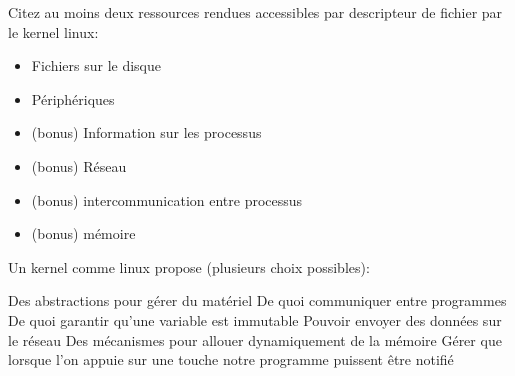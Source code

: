 \documentclass[11pt,a4paper,addpoint]{exam}
\begin{document}
\begin{questions}
    \question[2] Citez au moins deux ressources rendues accessibles par descripteur de fichier par le kernel linux:
    \ifprintanswers
    \begin{solution}
        \begin{itemize}
            \item Fichiers sur le disque
            \item Périphériques
            \item (bonus) Information sur les processus
            \item (bonus) Réseau
            \item (bonus) intercommunication entre processus
            \item (bonus) mémoire
        \end{itemize}
    \end{solution}
    \else
    \vspace{64pt}
    \fi

    \question[5] Un kernel comme linux propose (plusieurs choix possibles):
    \begin{checkboxes}
      \CorrectChoice Des abstractions pour gérer du matériel
      \CorrectChoice De quoi communiquer entre programmes
      \choice De quoi garantir qu'une variable est immutable
      \CorrectChoice Pouvoir envoyer des données sur le réseau
      \CorrectChoice Des mécanismes pour allouer dynamiquement de la mémoire
      \CorrectChoice Gérer que lorsque l'on appuie sur une touche notre programme puissent être notifié
    \end{checkboxes}
  \end{questions}
\end{document}
